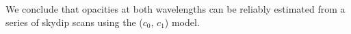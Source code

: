 We conclude that opacities at both wavelengths can be reliably
estimated from a series of skydip scans using the ($c_0$, $c_1$) model.










